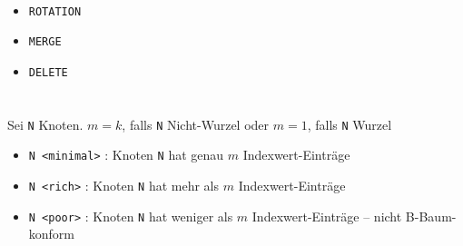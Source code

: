
\begin{frame}{\insertsection}
\framesubtitle{\insertsubsection}
\begin{itemize}
	\item \texttt{ROTATION}
	\item \texttt{MERGE}
	\item \texttt{DELETE} 
\end{itemize}
\end{frame}

\begin{frame}{\insertsection}
\framesubtitle{\insertsubsection}
\\[6pt]
Sei \texttt{N} Knoten. $m = k$, falls \texttt{N} Nicht-Wurzel oder $m=1$, falls \texttt{N} Wurzel
\begin{itemize}
\item \texttt{N <minimal>} : Knoten \texttt{N} hat genau $m$ Indexwert-Einträge 
\item \texttt{N <rich>}	:	Knoten \texttt{N} hat mehr als $m$ Indexwert-Einträge
\item \texttt{N <poor>}	:	Knoten \texttt{N} hat weniger als $m$ Indexwert-Einträge -- nicht B-Baum-konform
\end{itemize}
\end{frame}

